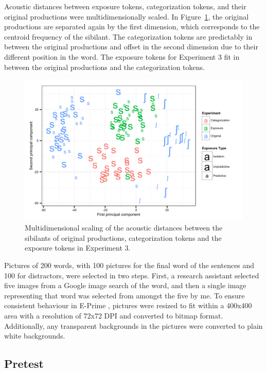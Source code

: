 Acoustic distances between exposure tokens, categorization tokens, and their original productions were multidimensionally scaled.  In Figure~\ref{fig:exp3mds}, the original productions are separated again by the first dimension, which corresponds to the centroid frequency of the sibilant.
The categorization tokens are predictably in between the original productions and offset in the second dimension due to their different position in the word.
The exposure tokens for Experiment 3 fit in between the original productions and the categorization tokens.

\begin{figure}[ht]
\caption{Multidimensional scaling of the acoustic distances between the sibilants of original productions, categorization tokens and the exposure tokens in Experiment 3.}
\label{fig:exp3mds}
\begin{center}
\includegraphics[width=\textwidth]{graphs/exp3_mds}
\end{center}
\end{figure}

Pictures of 200 words, with 100 pictures for the final word of the sentences and 100 for distractors, were selected in two steps.  
First, a research assistant selected five images from a Google image search of the word, and then a single image representing that word was selected from amongst the five by me.  
To ensure consistent behaviour in E-Prime \citep{PsychologySoftwareTools2012}, pictures were resized to fit within a 400x400 area with a resolution of 72x72 DPI and converted to bitmap format.  
Additionally, any transparent backgrounds in the pictures were converted to plain white backgrounds.

\subsection{Pretest}

